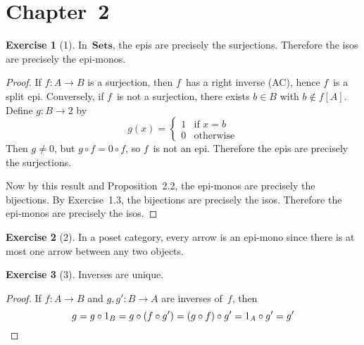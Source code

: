\documentclass[letterpaper,12pt]{article}
\newcommand{\Sets}{\mathbf{Sets}}
\newcommand{\after}{\circ}
\theoremstyle{definition}
\newtheorem*{exer}{Exercise}
\theoremstyle{remark}
\theoremstyle{direction}
\begin{document}
\section*{Chapter~2}
\begin{exer}[1]
In~\(\Sets\), the epis are precisely the surjections. Therefore the isos are precisely the epi-monos.
\end{exer}
\begin{proof}
If \(f:A\to B\) is a surjection, then \(f\)~has a right inverse (AC), hence \(f\)~is a split epi. Conversely, if \(f\)~is not a surjection, there exists \(b\in B\) with \(b\not\in f[A]\). Define \(g:B\to 2\) by
\[g(x)=\begin{cases}
1&\text{if }x=b\\
0&\text{otherwise}
\end{cases}\]
Then \(g\ne0\), but \(g\after f=0\after f\), so \(f\)~is not an epi. Therefore the epis are precisely the surjections.

Now by this result and Proposition~2.2, the epi-monos are precisely the bijections. By Exercise~1.3, the bijections are precisely the isos. Therefore the epi-monos are precisely the isos.
\end{proof}

\begin{exer}[2]
In a poset category, every arrow is an epi-mono since there is at most one arrow between any two objects.
\end{exer}

\begin{exer}[3]
Inverses are unique.
\end{exer}
\begin{proof}
If \(f:A\to B\) and \(g,g':B\to A\) are inverses of~\(f\), then
\[g=g\after 1_B=g\after(f\after g')=(g\after f)\after g'=1_A\after g'=g'\qedhere\]
\end{proof}
\end{document}
